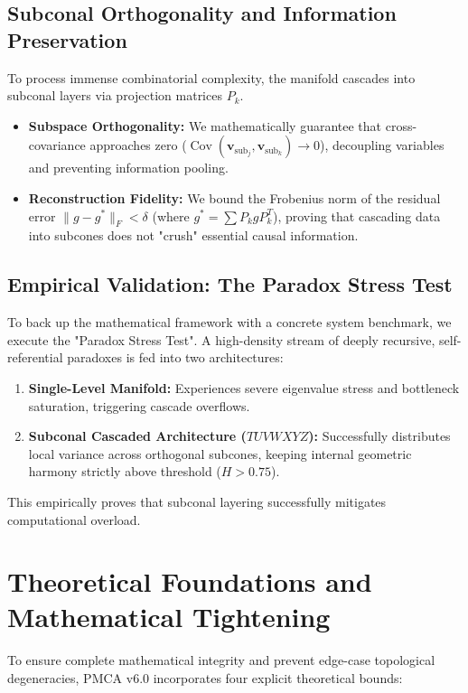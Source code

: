 \documentclass[12pt, a4paper]{article}
\begin{document}
\subsection{Subconal Orthogonality and Information Preservation}
To process immense combinatorial complexity, the manifold cascades into subconal layers via projection matrices $P_k$.
\begin{itemize}
    \item \textbf{Subspace Orthogonality:} We mathematically guarantee that cross-covariance approaches zero ($\operatorname{Cov}(\mathbf{v}_{\text{sub}_j}, \mathbf{v}_{\text{sub}_k}) \to 0$), decoupling variables and preventing information pooling.
    \item \textbf{Reconstruction Fidelity:} We bound the Frobenius norm of the residual error $\|g - g^*\|_F < \delta$ (where $g^* = \sum P_k g P_k^T$), proving that cascading data into subcones does not "crush" essential causal information.
\end{itemize}

\subsection{Empirical Validation: The Paradox Stress Test}
To back up the mathematical framework with a concrete system benchmark, we execute the "Paradox Stress Test". A high-density stream of deeply recursive, self-referential paradoxes is fed into two architectures:
\begin{enumerate}
    \item \textbf{Single-Level Manifold:} Experiences severe eigenvalue stress and bottleneck saturation, triggering cascade overflows.
    \item \textbf{Subconal Cascaded Architecture ($TUVWXYZ$):} Successfully distributes local variance across orthogonal subcones, keeping internal geometric harmony strictly above threshold ($H > 0.75$).
\end{enumerate}
This empirically proves that subconal layering successfully mitigates computational overload.

\section{Theoretical Foundations and Mathematical Tightening}

To ensure complete mathematical integrity and prevent edge-case topological degeneracies, PMCA v6.0 incorporates four explicit theoretical bounds:
\end{document}
